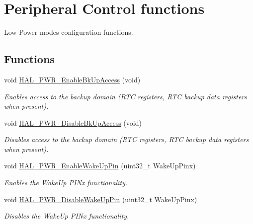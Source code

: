 \hypertarget{group___p_w_r___exported___functions___group2}{}\section{Peripheral Control functions}
\label{group___p_w_r___exported___functions___group2}


Low Power modes configuration functions.  


\subsection*{Functions}
\begin{DoxyCompactItemize}
\item 
void \hyperlink{group___p_w_r___exported___functions___group2_ga3d07cef39bf294db4aed7e06e5dbf9af}{H\+A\+L\+\_\+\+P\+W\+R\+\_\+\+Enable\+Bk\+Up\+Access} (void)
\begin{DoxyCompactList}\small\item\em Enables access to the backup domain (R\+TC registers, R\+TC backup data registers when present). \end{DoxyCompactList}\item 
void \hyperlink{group___p_w_r___exported___functions___group2_ga1513de5f2e4b72e094fb04bab786fec8}{H\+A\+L\+\_\+\+P\+W\+R\+\_\+\+Disable\+Bk\+Up\+Access} (void)
\begin{DoxyCompactList}\small\item\em Disables access to the backup domain (R\+TC registers, R\+TC backup data registers when present). \end{DoxyCompactList}\item 
void \hyperlink{group___p_w_r___exported___functions___group2_gaa76f42833a89110293f687b034164916}{H\+A\+L\+\_\+\+P\+W\+R\+\_\+\+Enable\+Wake\+Up\+Pin} (uint32\+\_\+t Wake\+Up\+Pinx)
\begin{DoxyCompactList}\small\item\em Enables the Wake\+Up P\+I\+Nx functionality. \end{DoxyCompactList}\item 
void \hyperlink{group___p_w_r___exported___functions___group2_gab12ca816929e23e36f5ed8f4ccdb1472}{H\+A\+L\+\_\+\+P\+W\+R\+\_\+\+Disable\+Wake\+Up\+Pin} (uint32\+\_\+t Wake\+Up\+Pinx)
\begin{DoxyCompactList}\small\item\em Disables the Wake\+Up P\+I\+Nx functionality. \end{DoxyCompactList}\item 

\end{DoxyCompactItemize}
